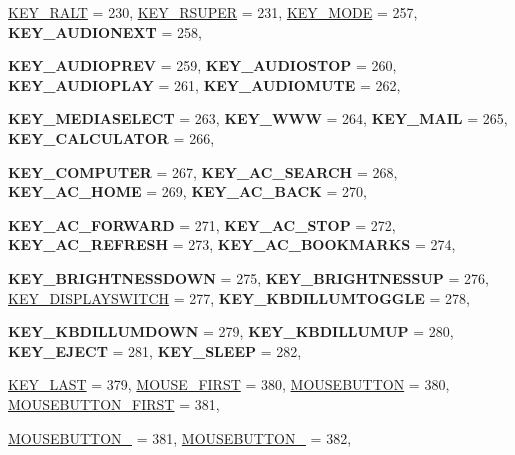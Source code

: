\begin{DoxyCompactItemize}
\par
\hyperlink{classphys_1_1MetaCode_a3e501cbb5bf0f6f1fdb7211465bda8d8aee151fcf77cce58411d19d9cb679875e}{KEY\_\-RALT} =  230, 
\hyperlink{classphys_1_1MetaCode_a3e501cbb5bf0f6f1fdb7211465bda8d8a84e2235ece031f83821867486ff52149}{KEY\_\-RSUPER} =  231, 
\hyperlink{classphys_1_1MetaCode_a3e501cbb5bf0f6f1fdb7211465bda8d8a9e26ea2006e876ccaa80fe4ae441da46}{KEY\_\-MODE} =  257, 
{\bfseries KEY\_\-AUDIONEXT} =  258, 
\par
{\bfseries KEY\_\-AUDIOPREV} =  259, 
{\bfseries KEY\_\-AUDIOSTOP} =  260, 
{\bfseries KEY\_\-AUDIOPLAY} =  261, 
{\bfseries KEY\_\-AUDIOMUTE} =  262, 
\par
{\bfseries KEY\_\-MEDIASELECT} =  263, 
{\bfseries KEY\_\-WWW} =  264, 
{\bfseries KEY\_\-MAIL} =  265, 
{\bfseries KEY\_\-CALCULATOR} =  266, 
\par
{\bfseries KEY\_\-COMPUTER} =  267, 
{\bfseries KEY\_\-AC\_\-SEARCH} =  268, 
{\bfseries KEY\_\-AC\_\-HOME} =  269, 
{\bfseries KEY\_\-AC\_\-BACK} =  270, 
\par
{\bfseries KEY\_\-AC\_\-FORWARD} =  271, 
{\bfseries KEY\_\-AC\_\-STOP} =  272, 
{\bfseries KEY\_\-AC\_\-REFRESH} =  273, 
{\bfseries KEY\_\-AC\_\-BOOKMARKS} =  274, 
\par
{\bfseries KEY\_\-BRIGHTNESSDOWN} =  275, 
{\bfseries KEY\_\-BRIGHTNESSUP} =  276, 
\hyperlink{classphys_1_1MetaCode_a3e501cbb5bf0f6f1fdb7211465bda8d8aadc4c974c86930fa73a693b7db4f7755}{KEY\_\-DISPLAYSWITCH} =  277, 
{\bfseries KEY\_\-KBDILLUMTOGGLE} =  278, 
\par
{\bfseries KEY\_\-KBDILLUMDOWN} =  279, 
{\bfseries KEY\_\-KBDILLUMUP} =  280, 
{\bfseries KEY\_\-EJECT} =  281, 
{\bfseries KEY\_\-SLEEP} =  282, 
\par
\hyperlink{classphys_1_1MetaCode_a3e501cbb5bf0f6f1fdb7211465bda8d8ac5e120aa1595bf2aa260df14b4a3498b}{KEY\_\-LAST} =  379, 
\hyperlink{classphys_1_1MetaCode_a3e501cbb5bf0f6f1fdb7211465bda8d8a1bb7f008c7d430e886141a3b8b697129}{MOUSE\_\-FIRST} =  380, 
\hyperlink{classphys_1_1MetaCode_a3e501cbb5bf0f6f1fdb7211465bda8d8a9cc80a2db206fb540fbb92a8ff64268a}{MOUSEBUTTON} =  380, 
\hyperlink{classphys_1_1MetaCode_a3e501cbb5bf0f6f1fdb7211465bda8d8a92ee5571be5e198a62eda83f27b27ab8}{MOUSEBUTTON\_\-FIRST} =  381, 
\par
\hyperlink{classphys_1_1MetaCode_a3e501cbb5bf0f6f1fdb7211465bda8d8ab9dca2791ddf9838ec7ef94d03392279}{MOUSEBUTTON\_} =  381, 
\hyperlink{classphys_1_1MetaCode_a3e501cbb5bf0f6f1fdb7211465bda8d8a9b823314bfb9f39a069a909cf8075c48}{MOUSEBUTTON\_} =  382, 

\end{DoxyCompactItemize}
